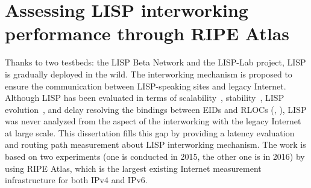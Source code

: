 
\chapter{Assessing LISP interworking performance through RIPE Atlas}
\label{cha:pxtr}
\ifpdf
    \graphicspath{{Chapter6/Pics/Raster/}{Chapter6/Pics/PDF/}{Chapter6/}}
\else
    \graphicspath{{Chapter6/Pics/Vector/}{Chapter6/}}
\fi

Thanks to two testbeds: the LISP Beta Network and the LISP-Lab project, LISP is gradually deployed in the wild. The interworking mechanism is proposed to ensure the communication between LISP-speaking sites and legacy Internet. %
Although LISP has been evaluated in terms of scalability~\cite{lispCCR}, stability~\cite{yue2016stability}, LISP evolution~\cite{li2017lisp}, and delay resolving the bindings between EIDs and RLOCs (\cite{lispCCR}, \cite{coras2014performance}), LISP was never analyzed from the aspect of the interworking with the legacy Internet at large scale. This dissertation fills this gap by providing a latency evaluation and routing path measurement about LISP interworking mechanism. The work is based on two experiments (one is conducted in 2015, the other one is in 2016) by using RIPE Atlas, which is the largest existing Internet measurement infrastructure for both IPv4 and IPv6. %

